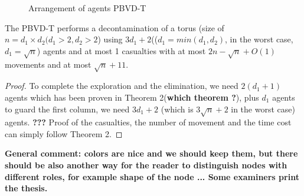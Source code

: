 \begin{figure} [H]
      \hspace{1in} 
  \caption{Arrangement of agents PBVD-T} 
  \label{fig:torus} %
\end{figure}

\begin{theorem}
The PBVD-T performs a decontamination of a torus (size of $n=d_1\times d_2(d_1>2,d_2>2$) using $3d_1+2$(($d_1=min(d_1,d_2)$, in the worst case, $d_1=\sqrt{n}$) agents and at most 1 casualties with at most $2n-\sqrt{n}+O(1)$ movements and at most $\sqrt{n}+11$.
\end{theorem}
\begin{proof}
To complete the exploration and the elimination, we need $2(d_1+1)$ agents which has been proven in Theorem 2({\bf which theorem ?}), plus  $d_1$ agents to guard the first column, we need $3d_1+2$ (which is $3\sqrt{n}+2$ in the worst case) agents. {\bf ???} Proof of the casualties, the number of movement and the time cost can simply follow Theorem 2.
\end{proof}




{\bf General comment: colors are nice and we should keep them, but there should be also another way for the reader to distinguish nodes with different roles, for example shape of the node ... Some examiners  print the thesis.}


